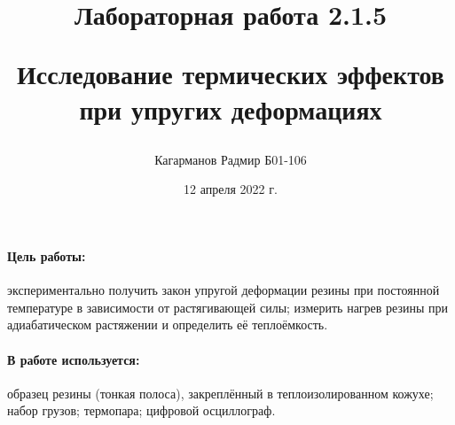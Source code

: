 \documentclass[a4paper,12pt]{article}
\title{Лабораторная работа 2.1.5 

Исследование термических эффектов при упругих деформациях}
\author{Кагарманов Радмир Б01-106}
\date{12 апреля 2022 г.}
\begin{document}
\maketitle
\newpage
\paragraph{Цель работы:}экспериментально получить закон упругой деформации резины при постоянной температуре в зависимости от растягивающей силы; измерить нагрев резины
при адиабатическом растяжении и определить её теплоёмкость.
\paragraph{В работе используется:}образец резины (тонкая полоса), закреплённый в теплоизолированном кожухе; набор грузов; термопара; цифровой осциллограф.
\end{document}
